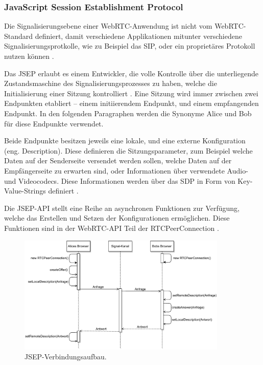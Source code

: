 \subsubsection{JavaScript Session Establishment Protocol}
Die Signalisierungsebene einer \acs{WebRTC}-Anwendung ist nicht vom \acs{WebRTC}-Standard definiert, damit verschiedene Applikationen mitunter verschiedene Signalisierungsprotkolle, wie zu Beispiel das \acf{SIP}, oder ein proprietäres Protokoll nutzen können \cite{loreto2014}.\par

Das \acf{JSEP} erlaubt es einem Entwickler, die volle Kontrolle über die unterliegende Zustandsmaschine des Signalisierungsprozesses zu haben, welche die Initialisierung einer Sitzung kontrolliert \cite{loreto2014}. Eine Sitzung wird immer zwischen zwei Endpunkten etabliert -- einem initiierendem Endpunkt, und einem empfangenden Endpunkt. In den folgenden Paragraphen werden die Synonyme \glqq{}Alice\grqq{} und \glqq{}Bob\grqq{} für diese Endpunkte verwendet.\par

Beide Endpunkte besitzen jeweils eine lokale, und eine externe Konfiguration (eng. \glqq{}Description\grqq{}). Diese definieren die Sitzungsparameter, zum Beispiel welche Daten auf der Senderseite versendet werden sollen, welche Daten auf der Empfängerseite zu erwarten sind, oder Informationen über verwendete Audio- und Videocodecs. Diese Informationen werden über das \acf{SDP} in Form von Key-Value-Strings definiert \cite{altanai2014}.\par

\newpage

Die \acs{JSEP}-\acs{API} stellt eine Reihe an asynchronen Funktionen zur Verfügung, welche das Erstellen und Setzen der Konfigurationen ermöglichen. Diese Funktionen sind in der \acs{WebRTC}-\acs{API} Teil der RTCPeerConnection \cite{rtcpeerconnection}.\par

\begin{figure}[h]
\centering
\includegraphics[width=0.89\textwidth]{bilder/PDF_SVG/JSEP.pdf}
\caption{\acs{JSEP}-Verbindungsaufbau.}
\label{fig:jsep}
\end{figure}

